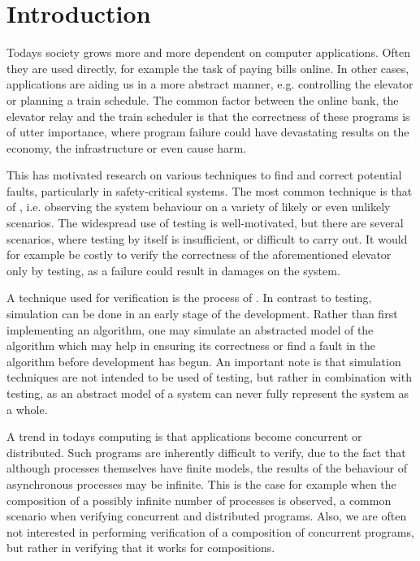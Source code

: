 \newpage
\section{Introduction}
Todays society grows more and more dependent on computer applications. Often they are used directly, for example the task of paying bills online. In other cases, applications are aiding us in a more abstract manner, e.g. controlling the elevator or planning a train schedule. The common factor between the online bank, the elevator relay and the train scheduler is that the correctness of these programs is of utter importance, where program failure could have devastating results on the economy, the infrastructure or even cause harm.

This has motivated research on various techniques to find and correct potential faults, particularly in safety-critical systems. The most common technique is that of , i.e. observing the system behaviour on a variety of likely or even unlikely scenarios. The widespread use of testing is well-motivated, but there are several scenarios, where testing by itself is insufficient, or difficult to carry out. It would for example be costly to verify the correctness of the aforementioned elevator only by testing, as a failure could result in damages on the system.

A technique used for verification is the process of . In contrast to testing, simulation can be done in an early stage of the development. Rather than first implementing an algorithm, one may simulate an abstracted model of the algorithm which may help in ensuring its correctness or find a fault in the algorithm before development has begun. An important note is that simulation techniques are not intended to be used  of testing, but rather in combination with testing, as an abstract model of a system can never fully represent the system as a whole.

A trend in todays computing is that applications become concurrent or distributed. Such programs are inherently difficult to verify, due to the fact that although processes themselves have finite models, the results of the behaviour of asynchronous processes may be infinite. This is the case for example when the composition of a possibly infinite number of processes is observed, a common scenario when verifying  concurrent and distributed programs. Also, we are often not interested in performing verification of a  composition of concurrent programs, but rather in verifying that it works for  compositions.

